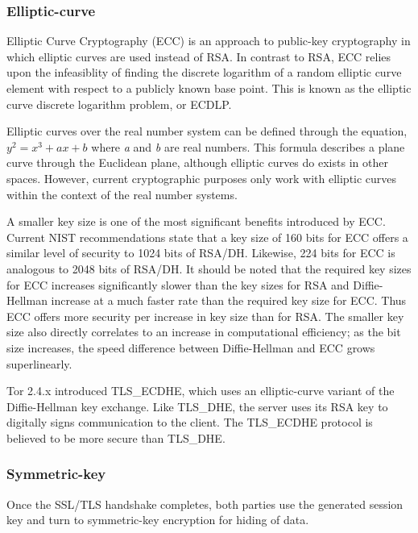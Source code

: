 \documentclass[journal]{IEEEtran}
\begin{document}
\subsubsection{Elliptic-curve}

Elliptic Curve Cryptography (ECC) is an approach to public-key cryptography in which elliptic curves are used instead of RSA. In contrast to RSA, ECC relies upon the infeasiblity of finding the discrete logarithm of a random elliptic curve element with respect to a publicly known base point. This is known as the elliptic curve discrete logarithm problem, or ECDLP.

Elliptic curves over the real number system can be defined through the equation, $ y^2 = x^3 + ax + b $ where \textit{a} and \textit{b} are real numbers. This formula describes a plane curve through the Euclidean plane, although elliptic curves do exists in other spaces. However, current cryptographic purposes only work with elliptic curves within the context of the real number systems.

A smaller key size is one of the most significant benefits introduced by ECC. Current NIST recommendations state that a key size of 160 bits for ECC offers a similar level of security to 1024 bits of RSA/DH. Likewise, 224 bits for ECC is analogous to 2048 bits of RSA/DH. It should be noted that the required key sizes for ECC increases significantly slower than the key sizes for RSA and Diffie-Hellman increase at a much faster rate than the required key size for ECC. Thus ECC offers more security per increase in key size than for RSA. The smaller key size also directly correlates to an increase in computational efficiency; as the bit size increases, the speed difference between Diffie-Hellman and ECC grows superlinearly.\cite{CaseForECC}

Tor 2.4.x introduced TLS\_ECDHE, which uses an elliptic-curve variant of the Diffie-Hellman key exchange. Like TLS\_DHE, the server uses its RSA key to digitally signs communication to the client. The TLS\_ECDHE protocol is believed to be more secure than TLS\_DHE.

\subsubsection{Symmetric-key}


Once the SSL/TLS handshake completes, both parties use the generated session key and turn to symmetric-key encryption for hiding of data.
\end{document}
